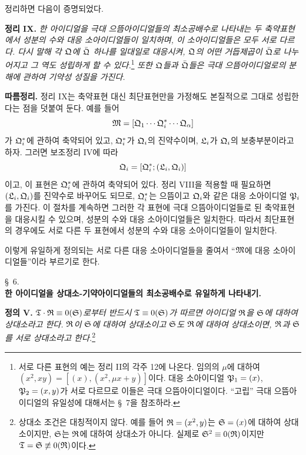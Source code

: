정리하면 다음이 증명되었다.

\textbf{정리 IX.} \emph{한 아이디얼을 극대 으뜸아이디얼들의 최소공배수로 나타내는 두 축약표현에서 성분의 수와 대응 소아이디얼들이 일치하며, 이 소아이디얼들은 모두 서로 다르다. 다시 말해 각 $\mathfrak{Q}$에 $\bar{\mathfrak{Q}}$ 하나를 일대일로 대응시켜, $\mathfrak{Q}$의 어떤 거듭제곱이 $\bar{\mathfrak{Q}}$로 나누어지고 그 역도 성립하게 할 수 있다.}\footnote{서로 다른 표현의 예는 정리 II의 각주 12에 나온다. 임의의 $\mu$에 대하여 $(x^2,xy)=[(x),(x^2,\mu x+y)]$이다. 대응 소아이디얼 $\mathfrak{P}_1=(x)$, $\mathfrak{P}_2=(x,y)$가 서로 다르므로 이들은 극대 으뜸아이디얼이다. ``고립'' 극대 으뜸아이디얼의 유일성에 대해서는 \S~7을 참조하라.} \emph{또한 $\mathfrak{Q}$들과 $\bar{\mathfrak{Q}}$들은 극대 으뜸아이디얼로의 분해에 관하여 기약성 성질을 가진다.}

\textbf{따름정리.} 정리 IX는 축약표현 대신 최단표현만을 가정해도 본질적으로 그대로 성립한다는 점을 덧붙여 둔다. 예를 들어
\[
 \mathfrak{M}=[\mathfrak{Q}_1\cdots\mathfrak{Q}_i^*\cdots\mathfrak{Q}_\alpha]
\]
가 $\mathfrak{Q}_i^*$에 관하여 축약되어 있고, $\mathfrak{Q}_i^*$가 $\mathfrak{Q}_i$의 진약수이며, $\mathfrak{L}_i$가 $\mathfrak{Q}_i$의 보충부분이라고 하자. 그러면 보조정리 IV에 따라
\[
 \mathfrak{Q}_i=[\mathfrak{Q}_i^*;(\mathfrak{L}_i,\mathfrak{Q}_i)]
\]
이고, 이 표현은 $\mathfrak{Q}_i^*$에 관하여 축약되어 있다. 정리 VIII을 적용할 때 필요하면 $(\mathfrak{L}_i,\mathfrak{Q}_i)$를 진약수로 바꾸어도 되므로, $\mathfrak{Q}_i^*$는 으뜸이고 $\mathfrak{Q}_i$와 같은 대응 소아이디얼 $\mathfrak{P}_i$를 가진다. 이 절차를 계속하면 그러한 각 표현에 극대 으뜸아이디얼들로 된 축약표현을 대응시킬 수 있으며, 성분의 수와 대응 소아이디얼들은 일치한다. 따라서 최단표현의 경우에도 서로 다른 두 표현에서 성분의 수와 대응 소아이디얼들이 일치한다.

이렇게 유일하게 정의되는 서로 다른 대응 소아이디얼들을 줄여서 ``$\mathfrak{M}$에 대응 소아이디얼들''이라 부르기로 한다.

\begin{center}
\S~6.\\[0.25em]
\textbf{한 아이디얼을 상대소-기약아이디얼들의 최소공배수로 유일하게 나타내기.}
\end{center}

\textbf{정의 V.} \emph{$\mathfrak{T}\cdot\mathfrak{R}\equiv0(\mathfrak{S})$로부터 반드시 $\mathfrak{T}\equiv0(\mathfrak{S})$가 따르면 아이디얼 $\mathfrak{R}$을 $\mathfrak{S}$에 대하여 상대소라고 한다. $\mathfrak{R}$이 $\mathfrak{S}$에 대하여 상대소이고 $\mathfrak{S}$도 $\mathfrak{R}$에 대하여 상대소이면, $\mathfrak{R}$과 $\mathfrak{S}$를 서로 상대소라고 한다.}\footnote{상대소 조건은 대칭적이지 않다. 예를 들어 $\mathfrak{R}=(x^2,y)$는 $\mathfrak{S}=(x)$에 대하여 상대소이지만, $\mathfrak{S}$는 $\mathfrak{R}$에 대하여 상대소가 아니다. 실제로 $\mathfrak{S}^2\equiv0(\mathfrak{R})$이지만 $\mathfrak{T}=\mathfrak{S}\not\equiv0(\mathfrak{R})$이다.}

